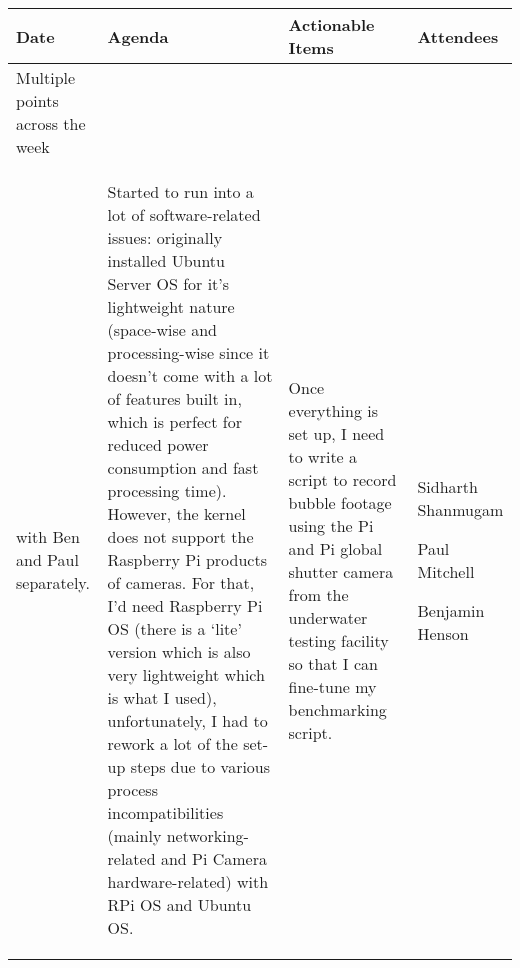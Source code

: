 \begin{table}[!h]
    \centering
    \begin{tabularx}{\textwidth}{|l|X|X|X|}
        \hline
        Date & Agenda & Actionable Items & Attendees \\
        \hline
        \hline
        Multiple points across the week\\with Ben and Paul separately. & 
        \begin{myitemize}
            \item Started to run into a lot of software-related issues: originally installed Ubuntu Server OS for it's lightweight nature (space-wise and processing-wise since it doesn't come with a lot of features built in, which is perfect for reduced power consumption and fast processing time). However, the kernel does not support the Raspberry Pi products of cameras. For that, I'd need Raspberry Pi OS (there is a `lite' version which is also very lightweight which is what I used), unfortunately, I had to rework a lot of the set-up steps due to various process incompatibilities (mainly networking-related and Pi Camera hardware-related) with RPi OS and Ubuntu OS.
        \end{myitemize} & 
        \begin{myitemize}
            \item Once everything is set up, I need to write a script to record bubble footage using the Pi and Pi global shutter camera from the underwater testing facility so that I can fine-tune my benchmarking script.
        \end{myitemize} &
        \begin{myitemize}
            \item Sidharth Shanmugam
            \item Paul Mitchell
            \item Benjamin Henson
        \end{myitemize} \\
        \hline
    \end{tabularx}
\end{table}

\pagebreak

